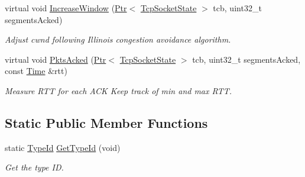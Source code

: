\begin{DoxyCompactItemize}
virtual void \hyperlink{classns3_1_1TcpIllinois_aed96b4a9fcf68ca3c290e4e7114d13c7}{Increase\+Window} (\hyperlink{classns3_1_1Ptr}{Ptr}$<$ \hyperlink{classns3_1_1TcpSocketState}{Tcp\+Socket\+State} $>$ tcb, uint32\+\_\+t segments\+Acked)
\begin{DoxyCompactList}\small\item\em Adjust cwnd following Illinois congestion avoidance algorithm. \end{DoxyCompactList}\item 
virtual void \hyperlink{classns3_1_1TcpIllinois_aa6531d04046528431302336d56592e23}{Pkts\+Acked} (\hyperlink{classns3_1_1Ptr}{Ptr}$<$ \hyperlink{classns3_1_1TcpSocketState}{Tcp\+Socket\+State} $>$ tcb, uint32\+\_\+t segments\+Acked, const \hyperlink{classns3_1_1Time}{Time} \&rtt)
\begin{DoxyCompactList}\small\item\em Measure R\+TT for each A\+CK Keep track of min and max R\+TT. \end{DoxyCompactList}\end{DoxyCompactItemize}
\subsection*{Static Public Member Functions}
\begin{DoxyCompactItemize}
\item 
static \hyperlink{classns3_1_1TypeId}{Type\+Id} \hyperlink{classns3_1_1TcpIllinois_adc3383abbe23617f509e10203f9aaaef}{Get\+Type\+Id} (void)
\begin{DoxyCompactList}\small\item\em Get the type ID. \end{DoxyCompactList}\end{DoxyCompactItemize}
